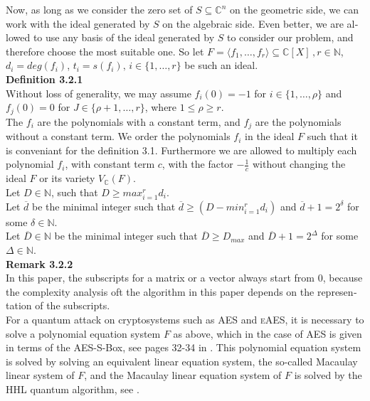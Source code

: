 \documentclass[a4paper,11pt]{article}
\begin{document}
\begin{otherlanguage}{english}
\noindent
Now, as long as we consider the zero set of $S \subseteq \mathbb{C}^n$ on the geometric side, we can work with the ideal generated by $S$ on the algebraic side. Even better, we are allowed to use any basis of the ideal generated by $S$ to consider our problem, and therefore choose the most suitable one. So let $F = \langle f_1, \ldots, f_r \rangle \subseteq \mathbb{C}[X]\, , r \in \mathbb{N}$, $d_i = deg(f_i)$, $t_i = s(f_i), \, i \in \{1, \ldots, r\}$ be such an ideal.\\

\noindent
\textbf{Definition 3.2.1}\\
Without loss of generality, we may assume $f_i(0) = -1$ for $i \in \{1, \ldots, \rho \}$ and $f_j(0) = 0$ for $J \in \{\rho + 1, \ldots, r \}$, where $1 \leq \rho \geq r$. \\

\noindent
The $f_i$ are the polynomials with a constant term, and $f_j$ are the polynomials without a constant term. We order the polynomials $f_i$ in the ideal $F$ such that it is conveniant for the definition 3.1. Furthermore we are allowed to multiply each polynomial $f_i$, with constant term $c$, with the factor $-\frac{1}{c}$ without changing the ideal $F$ or its variety $V_\mathbb{C}(F)$.\\


\noindent
Let $D \in \mathbb{N}$, such that $D \geq max_{i=1}^r d_i$. \\
Let $\overline{d}$ be the minimal integer such that $\overline{d} \geq (D - min_{i=1}^r d_i)$ and $\overline{d}+1= 2^\delta$ for some $\delta \in \mathbb{N}$. \\
Let $\overline{D} \in \mathbb{N}$ be the minimal integer such that $\overline{D} \geq D_{max}$ and $\overline{D}+1 = 2^\Delta$ for some $\Delta \in \mathbb{N}$. \\ 

\noindent
\textbf{Remark 3.2.2} \\
In this paper, the subscripts for a matrix or a vector always start from 0, because the complexity analysis oft the algorithm in this paper depends on the representation of the subscripts. \\

\noindent
For a quantum attack on cryptosystems such as \textsc{AES} and \textsc{eAES}, it is necessary to solve a polynomial equation system $F$ as above, which in the case of \textsc{AES} is given in terms of the \textsc{AES}-S-Box, see pages 32-34 in \cite{QAA}. This polynomial equation system is solved by solving an equivalent linear equation system, the so-called Macaulay linear system \cite{MCA} of $F$, and the Macaulay linear equation system of $F$ is solved by the \textsc{HHL} quantum algorithm, see \cite{HHL}.\\


\end{otherlanguage}
\end{document}
